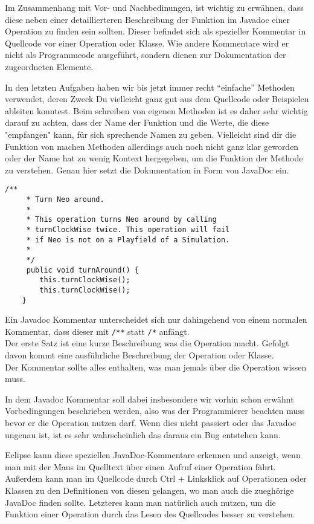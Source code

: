 \begin{Infobox}[Javadoc]
    Im Zusammenhang mit Vor- und Nachbedinungen, ist wichtig zu erwähnen, dass diese neben einer detaillierteren Beschreibung der Funktion im Javadoc einer Operation zu finden sein sollten.
    Dieser befindet sich als spezieller Kommentar in Quellcode vor einer Operation oder Klasse.
    Wie andere Kommentare wird er nicht als Programmcode ausgeführt, sondern dienen zur Dokumentation der zugeordneten Elemente.

    In den letzten Aufgaben haben wir bis jetzt immer recht \enquote{einfache} Methoden verwendet, deren Zweck Du vielleicht ganz gut aus dem Quellcode oder Beispielen ableiten konntest.
    Beim schreiben von eigenen Methoden ist es daher sehr wichtig darauf zu achten, dass der Name der Funktion und die Werte, die diese "empfangen" kann, für sich sprechende Namen zu geben.
    Vielleicht sind dir die Funktion von machen Methoden allerdings auch noch nicht ganz klar geworden oder der Name hat zu wenig Kontext hergegeben, um die Funktion der Methode
zu verstehen.
    Genau hier setzt die Dokumentation in Form von JavaDoc ein.

    \begin{lstlisting}[numbers=none]
    /**
     * Turn Neo around.
     *
     * This operation turns Neo around by calling
     * turnClockWise twice. This operation will fail 
     * if Neo is not on a Playfield of a Simulation.
     *
     */
     public void turnAround() {
        this.turnClockWise();
        this.turnClockWise();
    }
    \end{lstlisting}

    Ein Javadoc Kommentar unterscheidet sich nur dahingehend von einem normalen Kommentar, dass dieser mit \lstinline{/**} statt \lstinline{/*} anfängt.\\
    
    Der erste Satz ist eine kurze Beschreibung was die Operation macht.
    Gefolgt davon kommt eine ausführliche Beschreibung der Operation oder Klasse.\\

    Der Kommentar sollte alles enthalten, was man jemals über die Operation wissen muss.

    In dem Javadoc Kommentar soll dabei insbesondere wir vorhin schon erwähnt Vorbedingungen beschrieben werden, also was der Programmierer beachten muss bevor er die Operation nutzen darf.
    Wenn dies nicht passiert oder das Javadoc ungenau ist, ist es sehr wahrscheinlich das daraus ein Bug entstehen kann.

    Eclipse kann diese speziellen JavaDoc-Kommentare erkennen und anzeigt, wenn man mit der Maus im Quelltext über einen Aufruf einer Operation fährt.
    Außerdem kann man im Quellcode durch Ctrl + Linksklick auf Operationen oder Klassen zu den Definitionen von diesen gelangen, wo man auch die zueghörige JavaDoc finden sollte.
    Letzteres kann man natürlich auch nutzen, um die Funktion einer Operation durch das Lesen des Quellcodes besser zu verstehen.

\end{Infobox}

